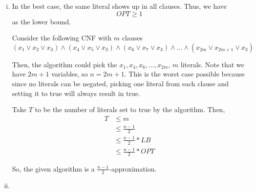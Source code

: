 \begin{enumerate}[(i)]
	\item In the best case, the same literal shows up in all clauses.
		Thus, we have
		\[
		OPT \geq 1
		\]
		as the lower bound.

		Consider the following CNF with $m$ clauses
		\[
			(x_1 \lor x_2 \lor x_3) \land (x_4 \lor x_5 \lor x_3) \land (x_6 \lor x_7 \lor x_3) \land \ldots \land (x_{2m} \lor x_{2m+1} \lor x_3)
		\]

		Then, the algorithm could pick the $x_1, x_4, x_6, \ldots, x_{2m}$, $m$ literals.
		Note that we have $2m + 1$ variables, so $n = 2m + 1$.
		This is the worst case possible because since no literals can be negated, picking one literal from each clause and setting it to true will always result in true.

		Take $T$ to be the number of literals set to true by the algorithm.
		Then,
		\begin{equation}
		\begin{split}
			T & \leq m  \\
				& \leq \frac{n-1}{2}\\
				& \leq \frac{n-1}{2} * LB \\
				& \leq \frac{n-1}{2} * OPT
		\end{split}
		\end{equation}

		So, the given algorithm is a $\frac{n-1}{2}$-approximation.
	\item
\end{enumerate}
